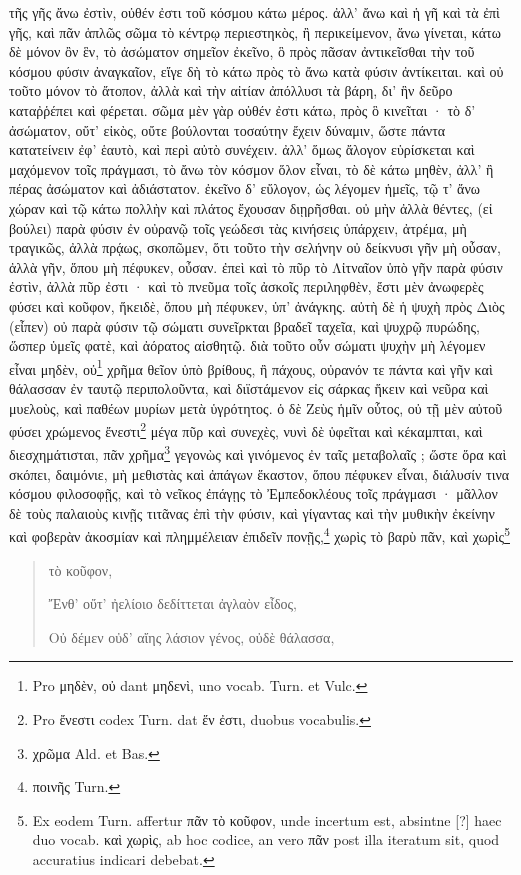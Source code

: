 \documentclass[a4paper, 11pt, oneside, polutonikogreek, german]{article}
\begin{document}
τῆς γῆς ἄνω ἐστὶν, οὐθέν ἐστι τοῦ κόσμου κάτω μέρος. ἀλλ' ἄνω καὶ ἡ γῆ καὶ τὰ ἐπὶ γῆς, καὶ πᾶν ἁπλῶς σῶμα τὸ κέντρῳ περιεστηκὸς, ἢ περικείμενον, ἄνω γίνεται, κάτω δὲ μόνον ὂν ἓν, τὸ ἀσώματον σημεῖον ἐκεῖνο, ὃ πρὸς πᾶσαν ἀντικεῖσθαι τὴν τοῦ κόσμου φύσιν ἀναγκαῖον, εἴγε δὴ τὸ κάτω πρὸς τὸ ἄνω κατὰ φύσιν ἀντίκειται. καὶ οὐ τοῦτο μόνον τὸ ἄτοπον, ἀλλὰ καὶ τὴν αἰτίαν ἀπόλλυσι τὰ βάρη, δι' ἣν δεῦρο καταῤῥέπει καὶ φέρεται. σῶμα μὲν γὰρ οὐθέν ἐστι κάτω, πρὸς ὃ κινεῖται · τὸ δ' ἀσώματον, οὔτ' εἰκὸς, οὔτε βούλονται τοσαύτην ἔχειν δύναμιν, ὥστε πάντα κατατείνειν ἐφ' ἑαυτὸ, καὶ περὶ αὐτὸ συνέχειν. ἀλλ' ὅμως ἄλογον εὑρίσκεται καὶ μαχόμενον τοῖς πράγμασι, τὸ ἄνω τὸν κόσμον ὅλον εἶναι, τὸ δὲ κάτω μηθὲν, ἀλλ' ἢ πέρας ἀσώματον καὶ ἀδιάστατον. ἐκεῖνο δ' εὔλογον, ὡς λέγομεν ἡμεῖς, τῷ τ' ἄνω χώραν καὶ τῷ κάτω πολλὴν καὶ πλάτος ἔχουσαν διῃρῆσθαι. οὐ μὴν ἀλλὰ θέντες, (εἰ βούλει) παρὰ φύσιν ἐν οὐρανῷ τοῖς γεώδεσι τὰς κινήσεις ὑπάρχειν, ἀτρέμα, μὴ τραγικῶς, ἀλλὰ πρᾴως, σκοπῶμεν, ὅτι τοῦτο τὴν σελήνην οὐ δείκνυσι γῆν μὴ οὖσαν, ἀλλὰ γῆν, ὅπου μὴ πέφυκεν, οὖσαν. ἐπεὶ καὶ τὸ πῦρ τὸ Λἰτναῖον ὑπὸ γῆν παρὰ φύσιν ἐστὶν, ἀλλὰ πῦρ ἐστι · καὶ τὸ πνεῦμα τοῖς ἀσκοῖς περιληφθὲν, ἔστι μὲν ἀνωφερὲς φύσει καὶ κοῦφον, ἥκειδὲ, ὅπου μὴ πέφυκεν, ὑπ' ἀνάγκης. αὐτὴ δὲ ἡ ψυχὴ πρὸς Διὸς (εἶπεν) οὐ παρὰ φύσιν τῷ σώματι συνεῖρκται βραδεῖ ταχεῖα, καὶ ψυχρῷ πυρώδης, ὥσπερ ὑμεῖς φατὲ, καὶ ἀόρατος αἰσθητῷ. διὰ τοῦτο οὖν σώματι ψυχὴν μὴ λέγομεν εἶναι μηδὲν, οὐ\footnote{Pro μηδὲν, οὐ dant μηδενὶ, uno vocab. Turn. et Vulc.} χρῆμα θεῖον ὑπὸ βρίθους, ἢ πάχους, οὐρανόν τε πάντα καὶ γῆν καὶ θάλασσαν ἐν ταυτῷ περιπολοῦντα, καὶ διϊστάμενον εἰς σάρκας ἥκειν καὶ νεῦρα καὶ μυελοὺς, καὶ παθέων μυρίων μετὰ ὑγρότητος. ὁ δὲ Ζεὺς ἡμῖν οὗτος, οὐ τῇ μὲν αὐτοῦ φύσει χρώμενος ἔνεστι\footnote{Pro ἔνεστι codex Turn. dat ἕν ἐστι, duobus vocabulis.} μέγα πῦρ καὶ συνεχὲς, νυνὶ δὲ ὑφεῖται καὶ κέκαμπται, καὶ διεσχημάτισται, πᾶν χρῆμα\footnote{χρῶμα Ald. et Bas.} γεγονὼς καὶ γινόμενος ἐν ταῖς μεταβολαῖς ; ὥστε ὅρα καὶ σκόπει, δαιμόνιε, μὴ μεθιστὰς καὶ ἀπάγων ἕκαστον, ὅπου πέφυκεν εἶναι, διάλυσίν τινα κόσμου φιλοσοφῇς, καὶ τὸ νεῖκος ἐπάγῃς τὸ Ἐμπεδοκλέους τοῖς πράγμασι · μᾶλλον δὲ τοὺς παλαιοὺς κινῇς τιτᾶνας ἐπὶ τὴν φύσιν, καὶ γίγαντας καὶ τὴν μυθικὴν ἐκείνην καὶ φοβερὰν ἀκοσμίαν καὶ πλημμέλειαν ἐπιδεῖν πονῇς,\footnote{ποινῆς Turn.} χωρὶς τὸ βαρὺ πᾶν, καὶ χωρὶς\footnote{Ex eodem Turn. affertur πᾶν τὸ κοῦφον, unde incertum est, absintne [?] haec duo vocab. καὶ χωρὶς, ab hoc codice, an vero πᾶν post illa iteratum sit, quod accuratius indicari debebat.}
\begin{quotation}
τὸ κοῦφον,

Ἔνθ' οὔτ' ἠελίοιο δεδίττεται ἀγλαὸν εἶδος,

Οὐ δέμεν οὐδ' αἴης λάσιον γένος, οὐδὲ θάλασσα,
\end{quotation}
\end{document}
